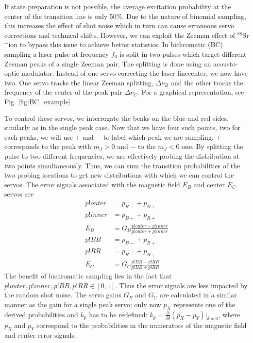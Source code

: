 \documentclass[a4paper,12pt]{article}
\newcommand{\sr}{$^{88}$Sr$^+$}
\newcommand{\pd}[2]{\frac{\partial #1}{\partial #2}}
\begin{document}
If state preparation is not possible, the average excitation probability at
the center of the transition line is only 50\%.
Due to the nature of binomial sampling, this increases the effect of shot noise
which in turn can cause erroneous servo corrections and technical shifts.
However, we can exploit the Zeeman effect of \sr ion to bypass this issue to 
achieve better statistics.
In bichromatic (BC) sampling a laser pulse at frequency $f_0$ is split in two
pulses which target different Zeeman peaks of a single Zeeman pair.
The splitting is done using an acousto-optic modulator.
Instead of one servo correcting the laser linecenter, we now have two.
One servo tracks the linear Zeeman splitting, $\Delta \nu_B$ and the other
tracks the frequency of the center of the peak pair $\Delta \nu_C$.
For a graphical representation, see Fig. \ref{fig:BC_example}

To control these servos, we interrogate the beaks on the blue and
red sides, similarly as in the single peak case.
Now that we have four such points, two for each peaks, we will use $+$ and $-$
to label which peak we are sampling.
$+$ corresponds to the peak with $m_J > 0$ and $-$ to the $m_J < 0$ one.
By splitting the pulse to two different frequencies, we are effectively
probing the distribution at two points simultaneously.
Thus, we can sum the transition probabilities of the two probing locations
to get new distributions with which we can control the servos.
The error signals associated with the magnetic field $E_B$ and center $E_C$ 
servos are
\begin{align}
  p!{outer} &= p_{R-} + p_{B+} \\
  p!{inner} &= p_{B-} + p_{R+} \\
  E_B &= G_B \frac{p!{outer} - p!{inner}}{p!{outer} + p!{inner}} \\
  p!{BB} &= p_{B-} + p_{B+} \\
  p!{RR} &= p_{R-} + p_{R+} \\
  E_C &= G_C \frac{p!{BB} - p!{RR}}{p!{BB} + p!{RR}} 
\end{align} 
The benefit of bichromatic sampling lies in the fact that $p!{outer}, p!{inner},
p!{BB}, p!{RR} \in [0,1]$.
Thus the error signals are less impacted by the random shot noise.
The servo gains $G_B$ and $G_C$ are calculated in a similar manner as the gain
for a single peak servo; only now $p_X$ represents one of the derived probabilities
and $k_p$ has to be redefined: $k_p = \pd{}{\delta} (p_X - p_Y) |_{\delta=0}$, where
$p_X$ and $p_Y$ correspond to the probabilities in the numerators of the
magnetic field and center error signals.
\end{document}
